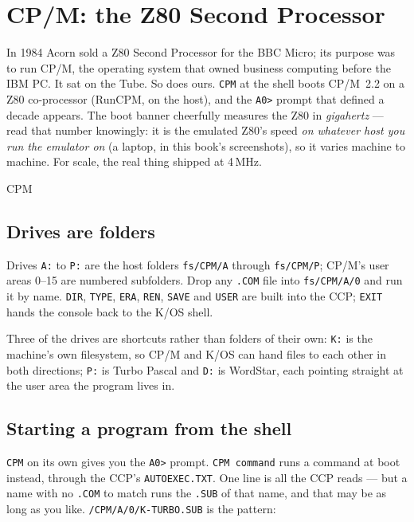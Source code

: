 \chapter{CP/M: the Z80 Second Processor}\label{cha:cpm}

In 1984 Acorn sold a Z80 Second Processor for the BBC Micro; its purpose
was to run CP/M, the operating system that owned business computing before
the IBM PC. It sat on the Tube. So does ours. \verb|CPM| at the shell boots
CP/M~2.2 on a Z80 co-processor (RunCPM, on the host), and the \verb|A0>|
prompt that defined a decade appears. The boot banner cheerfully measures
the Z80 in \emph{gigahertz} --- read that number knowingly: it is the
emulated Z80's speed \emph{on whatever host you run the emulator on} (a
laptop, in this book's screenshots), so it varies machine to machine.
For scale, the real thing shipped at 4\,MHz.

\begin{type}
CPM
\end{type}


\section{Drives are folders}
Drives \verb|A:| to \verb|P:| are the host folders \texttt{fs/CPM/A}
through \texttt{fs/CPM/P}; CP/M's user areas 0--15 are numbered subfolders.
Drop any \texttt{.COM} file into \texttt{fs/CPM/A/0} and run it by name.
\verb|DIR|, \verb|TYPE|, \verb|ERA|, \verb|REN|, \verb|SAVE| and
\verb|USER| are built into the CCP; \verb|EXIT| hands the console back to
the K/OS shell.

Three of the drives are shortcuts rather than folders of their own:
\verb|K:| is the machine's own filesystem, so CP/M and K/OS can hand files
to each other in both directions; \verb|P:| is Turbo Pascal and \verb|D:|
is WordStar, each pointing straight at the user area the program lives in.

\section{Starting a program from the shell}
\verb|CPM| on its own gives you the \verb|A0>| prompt. \verb|CPM command|
runs a command at boot instead, through the CCP's \texttt{AUTOEXEC.TXT}.
One line is all the CCP reads --- but a name with no \texttt{.COM} to
match runs the \texttt{.SUB} of that name, and that may be as long as you
like. \texttt{/CPM/A/0/K-TURBO.SUB} is the pattern:

